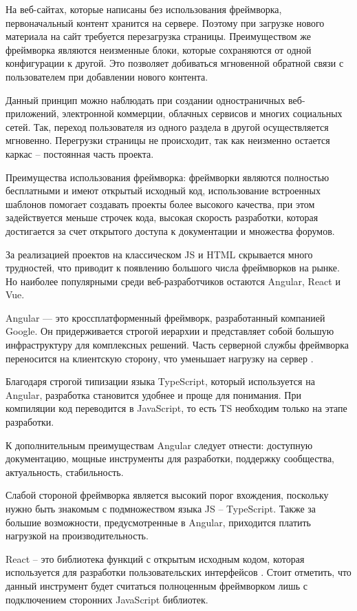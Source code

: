 На веб-сайтах, которые написаны без использования фреймворка, первоначальный контент хранится на сервере.
Поэтому при загрузке нового материала на сайт требуется перезагрузка страницы.
Преимуществом же фреймворка являются неизменные блоки, которые сохраняются от одной
конфигурации к другой.
Это позволяет добиваться мгновенной обратной связи с пользователем при добавлении нового контента.

Данный принцип можно наблюдать при создании одностраничных веб-приложений, электронной
коммерции, облачных сервисов и многих социальных сетей.
Так, переход пользователя из одного раздела в другой осуществляется мгновенно.
Перегрузки страницы не происходит, так как неизменно остается каркас – постоянная часть проекта.

Преимущества использования фреймворка: фреймворки являются полностью бесплатными и имеют открытый исходный код, использование встроенных шаблонов помогает создавать проекты более высокого качества, при этом задействуется меньше строчек кода, высокая скорость разработки, которая достигается за счет открытого доступа к документации и множества форумов.

За реализацией проектов на классическом JS и HTML скрывается много трудностей, что приводит к появлению большого числа фреймворков на рынке.
Но наиболее популярными среди веб-разработчиков остаются Angular, React и Vue.

Angular — это кроссплатформенный фреймворк, разработанный компанией Google.
Он придерживается строгой иерархии и представляет собой большую инфраструктуру для комплексных решений.
Часть серверной службы фреймворка переносится на клиентскую сторону, что уменьшает нагрузку на сервер \cite{sergacheva-framework-1}.

Благодаря строгой типизации языка TypeScript, который используется на Angular, разработка
становится удобнее и проще для понимания.
При компиляции код переводится в JavaScript, то есть TS необходим только на этапе разработки.

К дополнительным преимуществам Angular следует отнести: доступную документацию, мощные инструменты для разработки, поддержку сообщества, актуальность, стабильность.

Слабой стороной фреймворка является высокий порог вхождения, поскольку нужно быть знакомым с подмножеством языка JS – TypeScript.
Также за большие возможности, предусмотренные в Angular, приходится платить нагрузкой на
производительность.

React – это библиотека функций с открытым исходным кодом, которая используется для разработки пользовательских интерфейсов \cite{sergacheva-framework-2}.
Стоит отметить, что данный инструмент будет считаться полноценным фреймворком лишь с подключением сторонних JavaScript библиотек.

